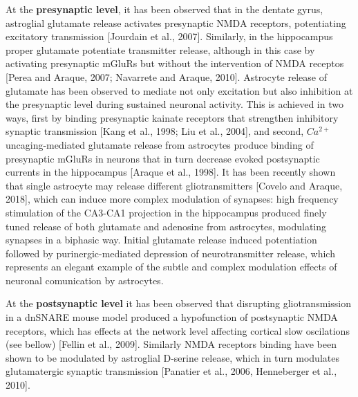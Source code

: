 At the \textbf{presynaptic level}, it has been observed that in the dentate gyrus, astroglial glutamate release activates presynaptic NMDA receptors, potentiating excitatory transmission [Jourdain et al., 2007].
Similarly, in the hippocampus proper glutamate potentiate transmitter release, although in this case by activating presynaptic mGluRs but without the intervention of NMDA receptos [Perea and Araque, 2007; Navarrete and Araque, 2010].
Astrocyte release of glutamate has been observed to mediate not only excitation but also inhibition at the presynaptic level during sustained neuronal activity.
This is achieved in two ways, first by binding presynaptic kainate receptors that strengthen inhibitory synaptic transmission [Kang et al., 1998; Liu et al., 2004], and second, $Ca^{2+}$ uncaging-mediated glutamate release from astrocytes produce binding of presynaptic mGluRs in neurons that in turn decrease evoked postsynaptic currents in the hippocampus [Araque et al., 1998].
It has been recently shown that single astrocyte may release different gliotransmitters [Covelo and Araque, 2018], which can induce more complex modulation of synapses: high frequency stimulation of the CA3-CA1 projection in the hippocampus produced finely tuned release of both glutamate and adenosine from astrocytes, modulating synapses in a biphasic way.
Initial glutamate release induced potentiation followed by purinergic-mediated depression of neurotransmitter release, which represents an elegant example of the subtle and complex modulation effects of neuronal comunication by astrocytes. 

At the \textbf{postsynaptic level} it has been observed that disrupting gliotransmission in a dnSNARE mouse model produced a hypofunction of postsynaptic NMDA receptors, which has effects at the network level affecting cortical slow oscilations (see bellow) [Fellin et al., 2009].
Similarly NMDA receptors binding have been shown to be modulated by astroglial D-serine release, which in turn modulates glutamatergic synaptic transmission [Panatier et al., 2006, Henneberger et al., 2010].

